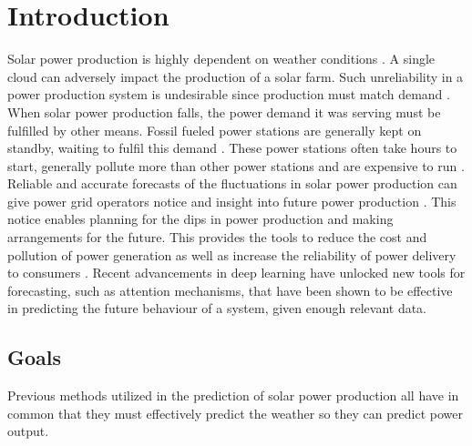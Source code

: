 \chapter{Introduction\label{cha:introduction}}

\vspace{1.5cm}

Solar power production is highly dependent on weather conditions \cite{lin_temporal_2020, lee_forecasting_2018, jaidee_very_2019, su_machine_2019, jang_solar_2016}. A single cloud can adversely impact the production of a solar farm. Such unreliability in a power production system is undesirable since production must match demand \cite{lee_forecasting_2018}. When solar power production falls, the power demand it was serving must be fulfilled by other means. Fossil fueled power stations are generally kept on standby, waiting to fulfil this demand \cite{lee_forecasting_2018}. These power stations often take hours to start, generally pollute more than other power stations and are expensive to run \cite{lee_forecasting_2018}.
Reliable and accurate forecasts of the fluctuations in solar power production can give power grid operators notice and insight into future power production \cite{lee_forecasting_2018}. This notice enables planning for the dips in power production and making arrangements for the future. This provides the tools to reduce the cost and pollution of power generation as well as increase the reliability of power delivery to consumers \cite{lee_forecasting_2018}.
Recent advancements in deep learning have unlocked new tools for forecasting, such as attention mechanisms, that have been shown to be effective in predicting the future behaviour of a system, given enough relevant data.\\



 \newpage
\section{Goals}
Previous methods utilized in the prediction of solar power production all have in common that they must effectively predict the weather so they can predict power output.

